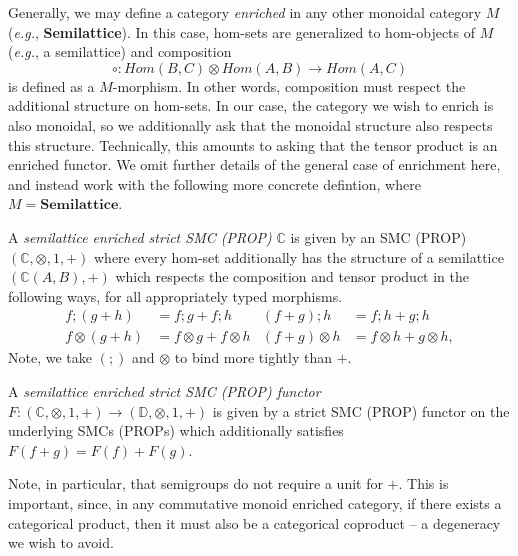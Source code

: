 Generally,  we may define a category \textit{enriched} in any other monoidal category $M$ (\textit{e.g.},  \textbf{Semilattice}).  In this case,  hom-sets are generalized to hom-objects of $M$ (\textit{e.g.},  a semilattice) and composition 
\[
	\circ: Hom(B,C) \otimes Hom(A,B) \to Hom(A,C)
\]
is defined as a $M$-morphism.  In other words,  composition must respect the additional structure on hom-sets.  
In our case,  the category we wish to enrich is also monoidal,  so we additionally ask that the monoidal structure also respects this structure.  Technically, this amounts to asking that the tensor product is an enriched functor. 
We omit further details of the general case of enrichment here, and instead work with the following more concrete defintion, where $M = \textbf{Semilattice}$. 



\begin{definition}
A \textit{semilattice enriched strict SMC (PROP)}  $\mathbb{C}$ is given by an SMC (PROP) $(\mathbb{C}, \otimes, 1,+)$ where every hom-set additionally has the structure of a semilattice $(\mathbb{C}(A,B), +)$ which respects the composition and tensor product in the following ways,  for all appropriately typed morphisms. 
\begin{align*}
f ; (g+h) &= f;g + f;h &
(f+g) ; h &= f;h + g;h \\
f \otimes (g+h) &= f \otimes g + f \otimes h & 
(f+g) \otimes h &= f \otimes h + g \otimes h,
\end{align*}
Note,  we take $(;\!)$ and $\otimes$ to bind more tightly than $+$.

A \textit{semilattice enriched strict SMC (PROP) functor} $F: (\mathbb{C}, \otimes, 1,+) \to (\mathbb{D}, \otimes, 1,+)$ is given by a strict SMC (PROP) functor on the underlying SMCs (PROPs) which additionally satisfies $F(f+g) = F(f)+F(g)$. 
\end{definition}
Note, in particular,  that semigroups  do not require a unit for $+$. {This is important, since, in any commutative monoid enriched category,  if there exists a categorical product, then it must also be a categorical coproduct -- a degeneracy we wish to avoid.}


